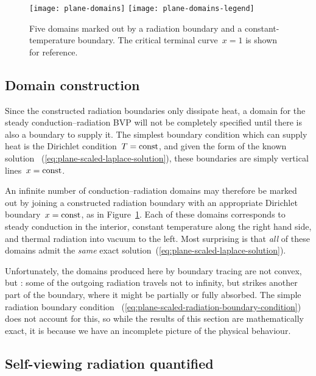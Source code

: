 \begin{figure}
  \centering
  \texttt{[image: plane-domains]}
  \texttt{[image: plane-domains-legend]}
  \caption{
    Five domains marked out by a radiation boundary
    and a constant-temperature boundary.
    The critical terminal curve~$x = 1$ is shown for reference.
  }
  \label{fig:plane-domains}
\end{figure}

\subsection{Domain construction}
\label{sec:cartesian.plane.domain}

Since the constructed radiation boundaries only dissipate heat,
a domain for the steady conduction--radiation BVP
will not be completely specified
until there is also a boundary to supply it.
The simplest boundary condition which can supply heat
is the Dirichlet condition~$T = \mathrm{const}$,
and given the form of the known solution~%
  (\ref{eq:plane-scaled-laplace-solution}),
these boundaries are simply vertical lines~$x = \mathrm{const}$.

An infinite number of conduction--radiation domains
may therefore be marked out
by joining a constructed radiation boundary
with an appropriate Dirichlet boundary~$x = \mathrm{const}$,
as in Figure~\ref{fig:plane-domains}.
Each of these domains corresponds to steady conduction in the interior,
constant temperature along the right hand side,
and thermal radiation into vacuum to the left.
Most surprising is that \emph{all} of these domains
admit the \emph{same} exact solution~(\ref{eq:plane-scaled-laplace-solution}).

Unfortunately,
the domains produced here by boundary tracing are not convex,
but :
some of the outgoing radiation travels not to infinity,
but strikes another part of the boundary,
where it might be partially or fully absorbed.
The simple radiation boundary condition~%
  (\ref{eq:plane-scaled-radiation-boundary-condition})
does not account for this,
so while the results of this section are mathematically exact,
it is because we have an incomplete picture of the physical behaviour.

\subsection{Self-viewing radiation quantified}
\label{sec:cartesian.plane.self-viewing}


